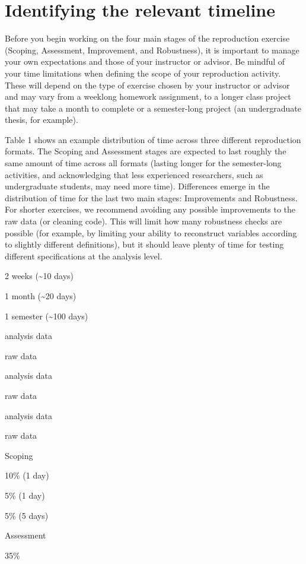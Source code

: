 \documentclass[
]{book}
\begin{document}
\hypertarget{identify-timeline}{%
\section{Identifying the relevant timeline}\label{identify-timeline}}

Before you begin working on the four main stages of the reproduction exercise (Scoping, Assessment, Improvement, and Robustness), it is important to manage your own expectations and those of your instructor or advisor. Be mindful of your time limitations when defining the scope of your reproduction activity. These will depend on the type of exercise chosen by your instructor or advisor and may vary from a weeklong homework assignment, to a longer class project that may take a month to complete or a semester-long project (an undergraduate thesis, for example).

Table 1 shows an example distribution of time across three different reproduction formats. The Scoping and Assessment stages are expected to last roughly the same amount of time across all formats (lasting longer for the semester-long activities, and acknowledging that less experienced researchers, such as undergraduate students, may need more time). Differences emerge in the distribution of time for the last two main stages: Improvements and Robustness. For shorter exercises, we recommend avoiding any possible improvements to the raw data (or cleaning code). This will limit how many robustness checks are possible (for example, by limiting your ability to reconstruct variables according to slightly different definitions), but it should leave plenty of time for testing different specifications at the analysis level.

2 weeks (\textasciitilde10 days)

1 month (\textasciitilde20 days)

1 semester (\textasciitilde100 days)

analysis data

raw data

analysis data

raw data

analysis data

raw data

Scoping

10\% (1 day)

5\% (1 day)

5\% (5 days)

Assessment

35\%
\end{document}
